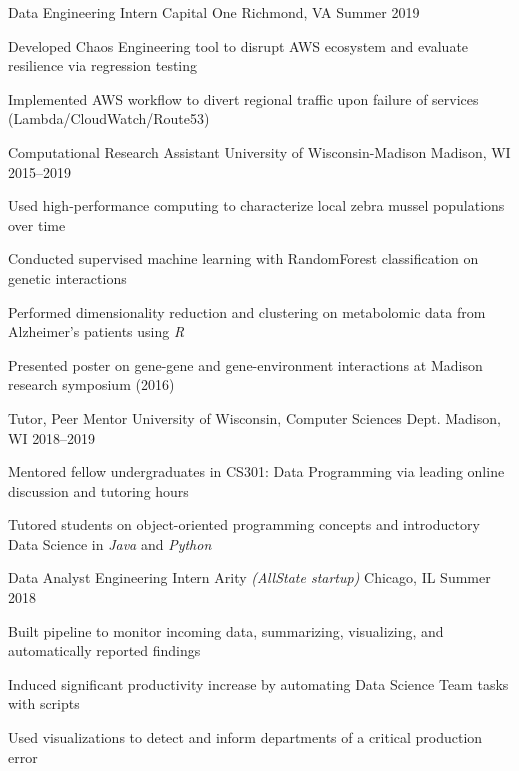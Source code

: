 \documentclass[10pt, letterpaper]{awesome-cv}
\begin{document}
\begin{cventries}
    \cventry
        {Data Engineering Intern}
        {Capital One}
        {Richmond, VA}
        {Summer 2019}
        {\begin{cvitems} 
            \item Developed Chaos Engineering tool to disrupt AWS ecosystem and evaluate resilience via regression testing 
            \item Implemented AWS workflow to divert regional traffic upon failure of services (Lambda/CloudWatch/Route53)
        \end{cvitems}}
        
    \cventry
        {Computational Research Assistant}
        {University of Wisconsin-Madison}
        {Madison, WI}
        {2015--2019}
        {\begin{cvitems} 
            \item Used high-performance computing to characterize local zebra mussel populations over time 
            \item Conducted supervised machine learning with RandomForest classification on genetic interactions
            \item Performed dimensionality reduction and clustering on metabolomic data from Alzheimer's patients using \textit{R}
            \item Presented poster on gene-gene and gene-environment interactions at Madison research symposium (2016) 
        \end{cvitems}}
    
    \cventry
        {Tutor, Peer Mentor}
        {University of Wisconsin, Computer Sciences Dept.}
        {Madison, WI}
        {2018--2019}
        {\begin{cvitems} 
          \item Mentored fellow undergraduates in CS301: Data Programming via leading online discussion and tutoring hours
          \item Tutored students on object-oriented programming concepts and introductory Data Science in \textit{Java} and \textit{Python}
        \end{cvitems}}  
        
    \cventry
        {Data Analyst Engineering Intern}
        {Arity \textit{(AllState startup)}}
        {Chicago, IL}
        {Summer 2018}
        {\begin{cvitems} 
            \item Built pipeline to monitor incoming data, summarizing, visualizing, and automatically reported findings
            \item Induced significant productivity increase by automating Data Science Team tasks with scripts
            \item Used visualizations to detect and inform departments of a critical production error
            \end{cvitems}}
            

\end{cventries}
\end{document}
